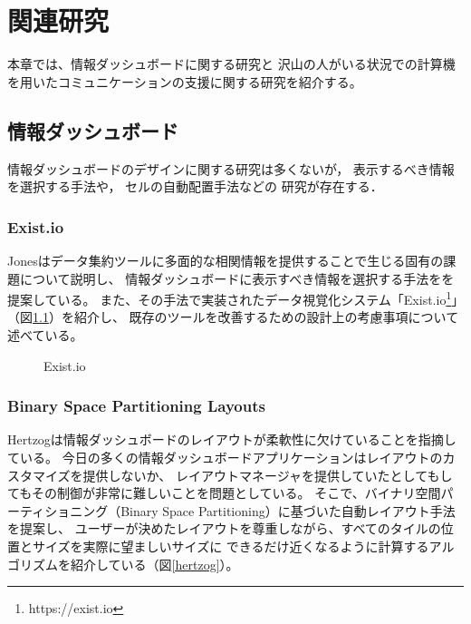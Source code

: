 \chapter{関連研究}
\label{chap:relevant}

本章では、情報ダッシュボードに関する研究と
沢山の人がいる状況での計算機を用いたコミュニケーションの支援に関する研究を紹介する。

\newpage

\section{情報ダッシュボード}

情報ダッシュボードのデザイン\cite{few}に関する研究は多くないが，
表示するべき情報を選択する手法\cite{Jones:2015:ECI:2800835.2800963}や，
セルの自動配置手法\cite{Hertzog:2015:BSP:2678025.2701383}などの
研究が存在する．

\subsection{Exist.io}
Jonesはデータ集約ツールに多面的な相関情報を提供することで生じる固有の課題について説明し、
情報ダッシュボードに表示すべき情報を選択する手法をを提案している。
また、その手法で実装されたデータ視覚化システム「Exist.io\footnote{https://exist.io}」（図\ref{existio}）を紹介し、
既存のツールを改善するための設計上の考慮事項について述べている。

\begin{figure}[H]
\centering
{}
\caption{Exist.io}
\label{existio}
\end{figure}

\subsection{Binary Space Partitioning Layouts}
Hertzogは情報ダッシュボードのレイアウトが柔軟性に欠けていることを指摘している\cite{Hertzog:2015:BSP:2678025.2701383}。
今日の多くの情報ダッシュボードアプリケーションはレイアウトのカスタマイズを提供しないか、
レイアウトマネージャを提供していたとしてもしてもその制御が非常に難しいことを問題としている。
そこで、バイナリ空間パーティショニング（Binary Space Partitioning）に基づいた自動レイアウト手法を提案し、
ユーザーが決めたレイアウトを尊重しながら、すべてのタイルの位置とサイズを実際に望ましいサイズに
できるだけ近くなるように計算するアルゴリズムを紹介している（図\ref{hertzog}）。

